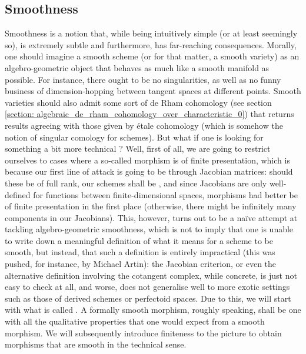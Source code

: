         \subsection{Smoothness}
            Smoothness is a notion that, while being intuitively simple (or at least seemingly so), is extremely subtle and furthermore, has far-reaching consequences. Morally, one should imagine a smooth scheme (or for that matter, a smooth variety) as an algebro-geometric object that behaves as much like a smooth manifold as possible. For instance, there ought to be no singularities, as well as no funny business of dimension-hopping between tangent spaces at different points. Smooth varieties should also admit some sort of de Rham cohomology (see section \ref{section: algebraic_de_rham_cohomology_over_characteristic_0}) that returns results agreeing with those given by \'etale cohomology (which is somehow the  notion of singular comology for schemes). But what if one is looking for something a bit more technical ? Well, first of all, we are going to restrict ourselves to cases where a so-called  morphism is of finite presentation, which is because our first line of attack is going to be through Jacobian matrices: should these be of full rank, our schemes shall be , and since Jacobians are only well-defined for functions between finite-dimensional spaces,  morphisms had better be of finite presentation in the first place (otherwise, there might be infinitely many components in our Jacobians). This, however, turns out to be a na\"ive attempt at tackling algebro-geometric smoothness, which is not to imply that one is unable to write down a meaningful definition of what it means for a scheme to be smooth, but instead, that such a definition is entirely impractical (this was pushed, for instance, by Michael Artin): the Jacobian criterion, or even the alternative definition involving the cotangent complex, while concrete, is just not easy to check at all, and worse, does not generalise well to more exotic settings such as those of derived schemes or perfectoid spaces. Due to this, we will start with what is called . A formally smooth morphism, roughly speaking, shall be one with all the qualitative properties that one would expect from a smooth morphism. We will subsequently introduce finiteness to the picture to obtain morphisms that are smooth in the technical sense. 
        
